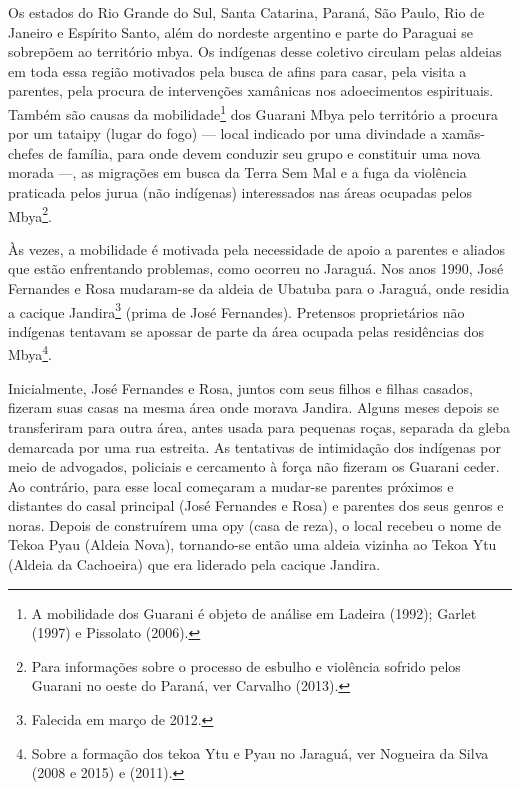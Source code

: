 Os estados do Rio Grande do Sul, Santa Catarina, Paraná, São Paulo, Rio
de Janeiro e Espírito Santo, além do nordeste argentino e parte do
Paraguai se sobrepõem ao território mbya. Os indígenas desse coletivo
circulam pelas aldeias em toda essa região motivados pela busca de
afins para casar, pela visita a parentes, pela procura de intervenções
xamânicas nos adoecimentos espirituais. Também são causas da
mobilidade\footnote{A mobilidade dos Guarani é objeto de análise em
Ladeira (1992); Garlet (1997) e Pissolato (2006).} dos Guarani Mbya
pelo território a procura por um tataipy (lugar do fogo) --- local
indicado por uma divindade a xamãs-chefes de família, para onde devem
conduzir seu grupo e constituir uma nova morada ---, as migrações em
busca da Terra Sem Mal e a fuga da violência praticada pelos jurua (não
indígenas) interessados nas áreas ocupadas pelos Mbya\footnote{Para
informações sobre o processo de esbulho e violência sofrido pelos
Guarani no oeste do Paraná, ver Carvalho (2013).}.

Às vezes, a mobilidade é motivada pela necessidade de apoio a parentes e
aliados que estão enfrentando problemas, como ocorreu no Jaraguá. Nos
anos 1990, José Fernandes e Rosa mudaram-se da aldeia de Ubatuba para o
Jaraguá, onde residia a cacique Jandira\footnote{Falecida em março de
2012.} (prima de José Fernandes). Pretensos proprietários não indígenas
tentavam se apossar de parte da área ocupada pelas residências dos
Mbya\footnote{Sobre a formação dos tekoa Ytu e Pyau no Jaraguá, ver
Nogueira da Silva (2008 e 2015) e  (2011).}. 

Inicialmente, José Fernandes e Rosa, juntos com seus filhos e filhas
casados, fizeram suas casas na mesma área onde morava Jandira. Alguns
meses depois se transferiram para outra área, antes usada para pequenas
roças, separada da gleba demarcada por uma rua estreita. As tentativas
de intimidação dos indígenas por meio de advogados, policiais e
cercamento à força não fizeram os Guarani ceder. Ao contrário, para
esse local começaram a mudar-se parentes próximos e distantes do casal
principal (José Fernandes e Rosa) e parentes dos seus genros e noras.
Depois de construírem uma opy (casa de reza), o local recebeu o nome de
Tekoa Pyau (Aldeia Nova), tornando-se então uma aldeia vizinha ao Tekoa
Ytu (Aldeia da Cachoeira) que era liderado pela cacique Jandira.

